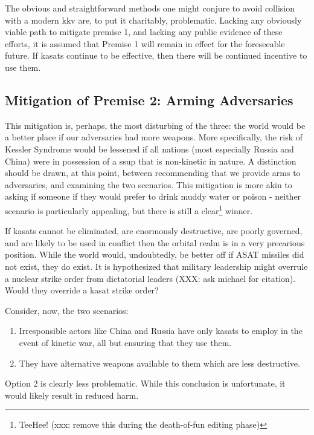 The obvious and straightforward methods one might conjure to avoid
collision with a modern \ac{kkv} are, to put it charitably,
problematic.  Lacking any obviously viable path to mitigate premise 1,
and lacking any public evidence of these efforts, it is assumed that
Premise 1 will remain in effect for the foreseeable future.  If
\acp{kasat} continue to be effective, then there will be continued
incentive to use them.

\subsection{Mitigation of Premise 2: Arming Adversaries}
This mitigation is, perhaps, the most disturbing of the three: the
world would be a better place if our adversaries had more weapons.
More specifically, the risk of Kessler Syndrome would be lessened if
all nations (most especially Russia and China) were in possession of a
\acf{ssup} that is non-kinetic in nature.  A distinction should be
drawn, at this point, between recommending that we provide arms to
adversaries, and examining the two scenarios.  This mitigation is more
akin to asking if someone if they would prefer to drink muddy water or
poison - neither scenario is particularly appealing, but there is
still a clear\footnote{TeeHee! (xxx: remove this during the
death-of-fun editing phase)} winner.

If \acp{kasat} cannot be eliminated, are enormously destructive, are
poorly governed, and are likely to be used in conflict then the
orbital realm is in a very precarious position.  While the world
would, undoubtedly, be better off if ASAT missiles did not exist, they
do exist.  It is hypothesized that military leadership might overrule
a nuclear strike order from dictatorial leaders (XXX: ask michael for
citation).  Would they override a \ac{kasat} strike order?

Consider, now, the two scenarios:

\begin{enumerate}
\item Irresponsible actors like China and Russia have only \acp{kasat}
  to employ in the event of kinetic war, all but ensuring that they
  use them.

\item They have alternative weapons available to them which are less
  destructive.
\end{enumerate}

Option 2 is clearly less problematic.  While this conclusion is
unfortunate, it would likely result in reduced harm.

